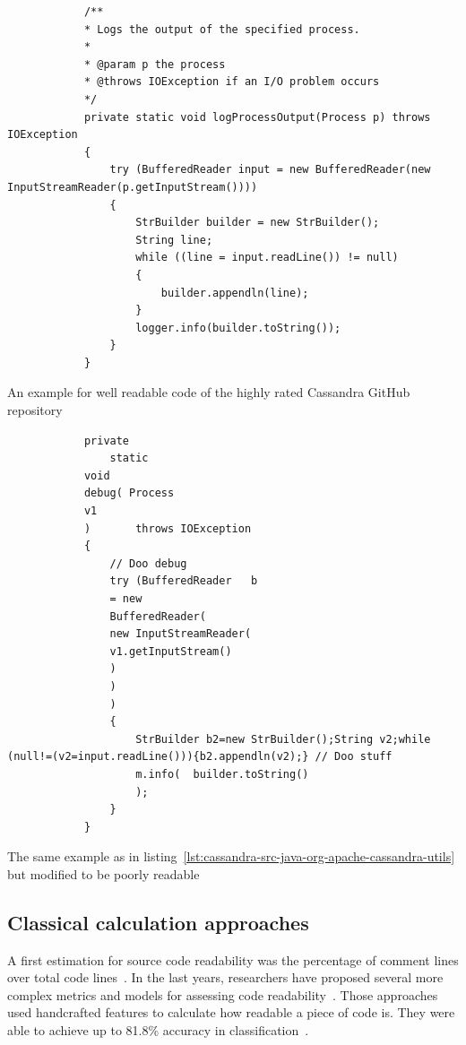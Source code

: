 \documentclass[%
class=scrreprt,
chapterprefix=false,%
open=right,%
twoside=false,%
paper=a4,%
logofile={Logo\_zentral\_farbig\_EN.png},%
thesistype=master,%
UKenglish,%
]{se2thesis}
\begin{document}
	\begin{listing}[!ht]
		\begin{verbatim}
			/**
			* Logs the output of the specified process.
			*
			* @param p the process
			* @throws IOException if an I/O problem occurs
			*/
			private static void logProcessOutput(Process p) throws IOException
			{
				try (BufferedReader input = new BufferedReader(new InputStreamReader(p.getInputStream())))
				{
					StrBuilder builder = new StrBuilder();
					String line;
					while ((line = input.readLine()) != null)
					{
						builder.appendln(line);
					}
					logger.info(builder.toString());
				}
			}
		\end{verbatim}
		\caption[An example for well readable code of the highly rated Cassandra GitHub repository]{An example for well readable code of the highly rated Cassandra GitHub repository}
		\label{lst:cassandra-src-java-org-apache-cassandra-utils}
	\end{listing}
	
	\begin{listing}[!ht]
		\begin{verbatim}
			private 
				static 
			void 
			debug( Process 
			v1 
			)       throws IOException
			{
				// Doo debug
				try (BufferedReader   b 
				= new 
				BufferedReader(
				new InputStreamReader(
				v1.getInputStream()
				)
				)
				)
				{
					StrBuilder b2=new StrBuilder();String v2;while (null!=(v2=input.readLine())){b2.appendln(v2);} // Doo stuff
					m.info(  builder.toString()
					);
				}
			}
		\end{verbatim}
		\caption{The same example as in listing~\ref{lst:cassandra-src-java-org-apache-cassandra-utils} but modified to be poorly readable}
		\label{lst:cassandra-src-java-org-apache-cassandra-utils-modified}
	\end{listing}
	
%	
%	
%	
	
	\subsection{Classical calculation approaches} \label{Classical calculation approaches}
	A first estimation for source code readability was the percentage of comment lines over total code lines~\cite{aggarwal2002integrated}. In the last years, researchers have proposed several more complex metrics and models for assessing code readability~\cite{buse2009learning, posnett2011simpler, dorn2012general, scalabrino2018comprehensive}.
	Those approaches used handcrafted features to calculate how readable a piece of code is. They were able to achieve up to 81.8\% accuracy in classification~\cite{scalabrino2018comprehensive}.
	
\end{document}
